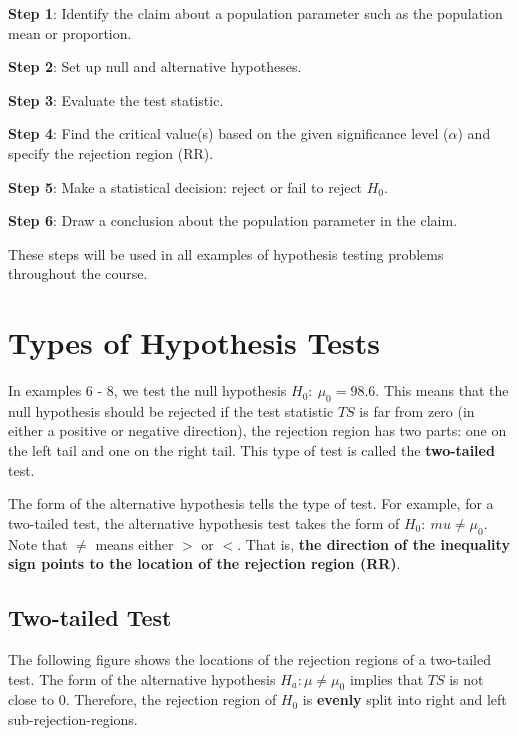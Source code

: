 \documentclass[
]{book}
\begin{document}
\textbf{Step 1}: Identify the claim about a population parameter such as the population mean or proportion.

\textbf{Step 2}: Set up null and alternative hypotheses.

\textbf{Step 3}: Evaluate the test statistic.

\textbf{Step 4}: Find the critical value(s) based on the given significance level (\(\alpha\)) and specify the rejection region (RR).

\textbf{Step 5}: Make a statistical decision: reject or fail to reject \(H_0\).

\textbf{Step 6}: Draw a conclusion about the population parameter in the claim.

These steps will be used in all examples of hypothesis testing problems throughout the course.

\hypertarget{types-of-hypothesis-tests}{%
\section{Types of Hypothesis Tests}\label{types-of-hypothesis-tests}}

In examples 6 - 8, we test the null hypothesis \(H_0: \ \mu_0 = 98.6\). This means that the null hypothesis should be rejected if the test statistic \(TS\) is far from zero (in either a positive or negative direction), the rejection region has two parts: one on the left tail and one on the right tail. This type of test is called the \textbf{two-tailed} test.

The form of the alternative hypothesis tells the type of test. For example, for a two-tailed test, the alternative hypothesis test takes the form of \(H_0: \ mu \ne \mu_0\). Note that \(\ne\) means either \(>\) or \(<\). That is, \textbf{the direction of the inequality sign points to the location of the rejection region (RR)}.

\hypertarget{two-tailed-test}{%
\subsection{Two-tailed Test}\label{two-tailed-test}}

The following figure shows the locations of the rejection regions of a two-tailed test. The form of the alternative hypothesis \(H_a: \mu \ne \mu_0\) implies that \(TS\) is not close to \(0\). Therefore, the rejection region of \(H_0\) is \textbf{evenly} split into right and left sub-rejection-regions.
\end{document}
